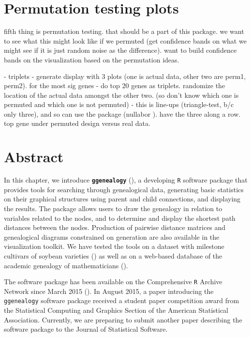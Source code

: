 \documentclass[11pt,a4paper,oldfontcommands,openany]{memoir}
\numberwithin{equation}{section} %
\newcommand{\pkg}[1]{{\texttt{#1}}}
\begin{document}
\section{Permutation testing plots}

fifth thing is permutation testing. that should be a part of this package. we want to see what this might look like if we permuted (get confidence bands on what we might see if it is just random noise as the difference). want to build confidence bands on the visualization based on the permutation ideas.

- triplets - generate display with 3 plots (one is actual data, other two are perm1, perm2). for the most sig genes
- do top 20 genes as triplets. randomize the location of the actual data amongst the other two. (so don’t know which one is permuted and which one is not permuted)
- this is line-ups (triangle-test, b/c only three), and so can use the package (nullabor \citealt{nullabor}). have the three along a row. top gene under permuted design versus real data.














\section{Abstract}

In this chapter, we introduce \textbf{\pkg{ggenealogy}} (\citealt{ggen}), a developing \pkg{R} software package that provides tools for searching through genealogical data, generating basic statistics on their graphical structures using parent and child connections, and displaying the results. The package allows users to draw the genealogy in relation to variables related to the nodes, and to determine and display the shortest path distances between the nodes. Production of pairwise distance matrices and genealogical diagrams constrained on generation are also available in the visualization toolkit. We have tested the tools on a dataset with milestone cultivars of soybean varieties (\citealt{soybean}) as well as on a web-based database of the academic genealogy of mathematicians (\citealt{mgp}).

The software package has been available on the Comprehensive \pkg{R} Archive Network since March 2015 (\citealt{ggen}). In August 2015, a paper introducing the \pkg{ggenealogy} software package received a student paper competition award from the Statistical Computing and Graphics Section of the American Statistical Association. Currently, we are preparing to submit another paper describing the software package to the Journal of Statistical Software.
\end{document}

